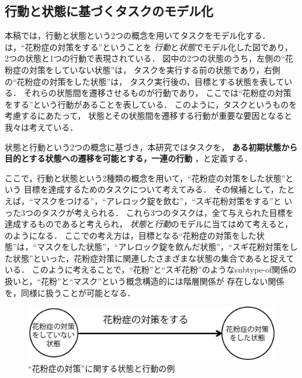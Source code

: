 \documentclass[submit,techreq]{ipsj}
\begin{document}
\subsection{行動と状態に基づくタスクのモデル化}
本稿では，行動と状態という2つの概念を用いてタスクをモデル化する．
は，``花粉症の対策をする''ということを
\textit{行動}と\textit{状態}でモデル化した図であり，
2つの状態と1つの行動で表現されている．
図中の2つの状態のうち，左側の``花粉症の対策をしていない状態''は，
タスクを実行する前の状態であり，右側の``花粉症の対策をした状態''は，
タスク実行後の，目標とする状態を表している．
それらの状態間を遷移させるものが行動であり，
ここでは``花粉症の対策をする''という行動があることを表している．
このように，タスクというものを考慮するにあたって，
状態とその状態間を遷移する行動が重要な要因となると我々は考えている．

状態と行動という2つの概念に基づき，本研究ではタスクを，
\textbf{ある初期状態から目的とする状態への遷移を可能とする，一連の行動}
，と定義する．





ここで，行動と状態という2種類の概念を用いて，``花粉症の対策をした状態''という
目標を達成するためのタスクについて考えてみる．
その候補として，たとえば，``マスクをつける''，``アレロック錠を飲む''，``スギ花粉対策をする''と
いった3つのタスクが考えられる．
これら3つのタスクは，全て与えられた目標を達成するものであると考えられ，
\textit{状態}と\textit{行動}のモデルに当てはめて考えると，のようになる．
ここでの考え方は，目標となる``花粉症の対策をした状態''は，``マスクをした状態''，``アレロック錠を飲んだ状態''，``スギ花粉対策をした状態''といった，花粉症対策に関連したさまざまな状態の集合であると捉えている．
このように考えることで，``花粉''と``スギ花粉''のようなsubtype-of関係の
扱いと，``花粉''と``マスク''という概念構造的には階層関係が
存在しない関係を，同様に扱うことが可能となる．


\begin{figure}[t]
\centering
\includegraphics[width=0.9\hsize]{state_action.eps}
\vspace{-0.5em}
\caption{``花粉症の対策''に関する状態と行動の例}
\label{fig:state_action}
\end{figure}
\end{document}
